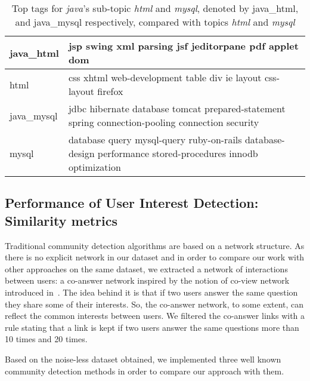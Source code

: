 \begin{table}[htp]
\caption{Top tags for \textit{java}'s sub-topic \textit{html} and \textit{mysql}, denoted by java\_html, and java\_mysql respectively, compared with topics \textit{html} and \textit{mysql}}
\label{tab:comparedwithsubtopic}
\centering
\begin{tabular}{|p{0.8in}|p{4.2in}|}
\hline
java\_html& jsp swing xml parsing jsf jeditorpane pdf applet dom\\
\hline
html & css xhtml web-development table div ie layout css-layout firefox\\
\hline
\hline
java\_mysql&jdbc hibernate database tomcat prepared-statement spring connection-pooling connection security \\
\hline
mysql &database query mysql-query ruby-on-rails database-design performance stored-procedures innodb optimization\\
\hline
\end{tabular}
\end{table}

\subsection{Performance of User Interest Detection: Similarity metrics}
Traditional community detection algorithms are based on a network structure. As there is no explicit network in our dataset and in order to compare our work with other approaches on the same dataset, we extracted a network of interactions between users: a co-answer network inspired by the notion of co-view network introduced in~\cite{DBLP:conf/icwsm/GargiLMY11}. The idea behind it is that if two users answer the same question they share some of their interests. So, the co-answer network, to some extent, can reflect the common interests between users. We filtered the co-answer links with a rule stating that a link is kept if two users answer the same questions more than 10 times and 20 times.

Based on the noise-less dataset obtained, we implemented three well known community detection methods in order to compare our approach with them.

